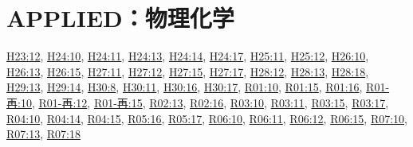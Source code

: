 \section{APPLIED：物理化学}
\hyperref[q:h23-reg-applied-12]{H23:12}, \hyperref[q:h24-reg-applied-10]{H24:10}, \hyperref[q:h24-reg-applied-11]{H24:11}, \hyperref[q:h24-reg-applied-13]{H24:13}, \hyperref[q:h24-reg-applied-14]{H24:14}, \hyperref[q:h24-reg-applied-17]{H24:17}, \hyperref[q:h25-reg-applied-11]{H25:11}, \hyperref[q:h25-reg-applied-12]{H25:12}, \hyperref[q:h26-reg-applied-10]{H26:10}, \hyperref[q:h26-reg-applied-13]{H26:13}, \hyperref[q:h26-reg-applied-15]{H26:15}, \hyperref[q:h27-reg-applied-11]{H27:11}, \hyperref[q:h27-reg-applied-12]{H27:12}, \hyperref[q:h27-reg-applied-15]{H27:15}, \hyperref[q:h27-reg-applied-17]{H27:17}, \hyperref[q:h28-reg-applied-12]{H28:12}, \hyperref[q:h28-reg-applied-13]{H28:13}, \hyperref[q:h28-reg-applied-18]{H28:18}, \hyperref[q:h29-reg-applied-13]{H29:13}, \hyperref[q:h29-reg-applied-14]{H29:14}, \hyperref[q:h30-reg-applied-08]{H30:8}, \hyperref[q:h30-reg-applied-11]{H30:11}, \hyperref[q:h30-reg-applied-16]{H30:16}, \hyperref[q:h30-reg-applied-17]{H30:17}, \hyperref[q:r01-reg-applied-10]{R01:10}, \hyperref[q:r01-reg-applied-15]{R01:15}, \hyperref[q:r01-reg-applied-16]{R01:16}, \hyperref[q:r01-ret-applied-10]{R01-再:10}, \hyperref[q:r01-ret-applied-12]{R01-再:12}, \hyperref[q:r01-ret-applied-15]{R01-再:15}, \hyperref[q:r02-reg-applied-13]{R02:13}, \hyperref[q:r02-reg-applied-16]{R02:16}, \hyperref[q:r03-reg-applied-10]{R03:10}, \hyperref[q:r03-reg-applied-11]{R03:11}, \hyperref[q:r03-reg-applied-15]{R03:15}, \hyperref[q:r03-reg-applied-17]{R03:17}, \hyperref[q:r04-reg-applied-10]{R04:10}, \hyperref[q:r04-reg-applied-14]{R04:14}, \hyperref[q:r04-reg-applied-15]{R04:15}, \hyperref[q:r05-reg-applied-16]{R05:16}, \hyperref[q:r05-reg-applied-17]{R05:17}, \hyperref[q:r06-reg-applied-10]{R06:10}, \hyperref[q:r06-reg-applied-11]{R06:11}, \hyperref[q:r06-reg-applied-12]{R06:12}, \hyperref[q:r06-reg-applied-15]{R06:15}, \hyperref[q:r07-reg-applied-10]{R07:10}, \hyperref[q:r07-reg-applied-13]{R07:13}, \hyperref[q:r07-reg-applied-18]{R07:18}
